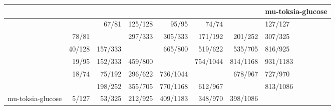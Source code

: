 \begin{tabular}{lrrrrrr}
\toprule
{} &   &    &    &     &     &     & mu-toksia-glucose \\
\midrule
{}            &         &    67/81 &  125/128 &     95/95 &     74/74 &           &           127/127 \\
            &   78/81 &          &  297/333 &   305/333 &   171/192 &   201/252 &           307/325 \\
            &  40/128 &  157/333 &          &   665/800 &   519/622 &   535/705 &           816/925 \\
            &   19/95 &  152/333 &  459/800 &           &  754/1044 &  814/1168 &          931/1183 \\
            &   18/74 &   75/192 &  296/622 &  736/1044 &           &   678/967 &           727/970 \\
            &         &  198/252 &  355/705 &  770/1168 &   612/967 &           &          813/1086 \\
mu-toksia-glucose &   5/127 &   53/325 &  212/925 &  409/1183 &   348/970 &  398/1086 &                   \\
\bottomrule
\end{tabular}
